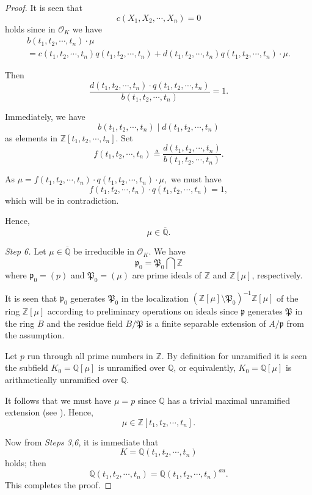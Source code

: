 \documentclass{amsart}
\theoremstyle{definition}
\numberwithin{equation}{section}
\begin{document}
\begin{proof}
It is seen that
$$c(X_{1},X_{2},\cdots,X_{n})=0$$
holds since in $\mathcal{O}_{K}$ we have
\begin{equation*}
\begin{array}{l}
b(t_{1},t_{2},\cdots,t_{n})\cdot\mu\\

=c(t_{1},t_{2},\cdots,t_{n})q(t_{1},t_{2},\cdots,t_{n})+d(t_{1},t_{2},\cdots,t_{n})
q(t_{1},t_{2},\cdots,t_{n})\cdot\mu.
\end{array}
\end{equation*}

Then
$$\frac{d(t_{1},t_{2},\cdots,t_{n})\cdot q(t_{1},t_{2},\cdots,t_{n})}{b(t_{1},t_{2},\cdots,t_{n})}=1.$$

Immediately, we have $$b(t_{1},t_{2},\cdots,t_{n})\mid d(t_{1},t_{2},\cdots,t_{n})$$ as elements in $\mathbb{Z}[t_{1},t_{2},\cdots,t_{n}]$. Set $$f(t_{1},t_{2},\cdots,t_{n})\triangleq\frac{d(t_{1},t_{2},\cdots,t_{n})}{b(t_{1},t_{2},\cdots,t_{n})}.$$

As $\mu=f(t_{1},t_{2},\cdots,t_{n})\cdot q(t_{1},t_{2},\cdots,t_{n})\cdot\mu,$ we must have
$$f(t_{1},t_{2},\cdots,t_{n})\cdot q(t_{1},t_{2},\cdots,t_{n})=1,$$
which will be in contradiction.

Hence, $$\mu\in \overline{\mathbb{Q}}.$$

\emph{Step 6.} Let $\mu\in \overline{\mathbb{Q}}$  be irreducible  in $\mathcal{O}_{K}$. We have
\begin{equation*}
\mathfrak{p}_{0}=\mathfrak{P}_{0}\bigcap \mathbb{Z}
\end{equation*}
where $\mathfrak{p}_{0}=(p)$ and $\mathfrak{P}_{0}=(\mu)$ are prime ideals of $\mathbb{Z}$ and $\mathbb{Z}[\mu]$, respectively.


It is seen that $\mathfrak{p}_{0}$ generates $\mathfrak{P}_{0}$ in the localization $(\mathbb{Z}[\mu]\setminus \mathfrak{P}_{0})^{-1}\mathbb{Z}[\mu]$ of the ring $\mathbb{Z}[\mu]$ according to preliminary operations on ideals since $\mathfrak{p}$ generates $\mathfrak{P}$ in the ring $B$ and the residue
field $B/\mathfrak{P}$ is a finite separable extension of $A/\mathfrak{p}$
from the assumption.

Let $p$ run through all prime numbers in $\mathbb{Z}$. By definition for unramified it is seen the subfield $K_{0}=\mathbb{Q}[\mu]$
is unramified over $\mathbb{Q}$, or
equivalently, $K_{0}=\mathbb{Q}[\mu]$ is arithmetically  unramified over $\mathbb{Q}$.

It follows that we must have
$
\mu=p
$
since $\mathbb{Q}$ has a trivial maximal unramified extension (see \cite{neu}). Hence, $$ \mu\in \mathbb{Z}[t_{1},t_{2},\cdots,t_{n}].$$

Now from \emph{Steps 3,6}, it is immediate that
\begin{equation*}
K=\mathbb{Q}(t_{1},t_{2},\cdots,t_{n})
\end{equation*}
holds; then
\begin{equation*}
\mathbb{Q}(t_{1},t_{2},\cdots,t_{n})=\mathbb{Q}(t_{1},t_{2},\cdots,t_{n})^{au}.
\end{equation*}
This completes the proof.
\end{proof}
\end{document}
